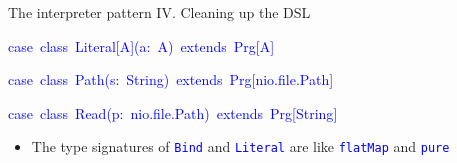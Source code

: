 \documentclass[english,,russian]{beamer}
\newenvironment{lyxcode}
  {\par\begin{list}{}{
    \setlength{\rightmargin}{\leftmargin}
    \setlength{\listparindent}{0pt}%
    \raggedright
    \setlength{\itemsep}{0pt}
    \setlength{\parsep}{0pt}
    \normalfont\ttfamily}%
   \def\{{\char`\{}
   \def\}{\char`\}}
   \def\textasciitilde{\char`\~}
   \item[]}
  {\end{list}}
\begin{document}
\begin{frame}{The interpreter pattern IV. Cleaning up the DSL}
\begin{lyxcode}
\textcolor{blue}{\footnotesize{}case~class~Literal{[}A{]}(a:~A)~extends~Prg{[}A{]}}{\footnotesize\par}

\textcolor{blue}{\footnotesize{}case~class~Path(s:~String)~extends~Prg{[}nio.file.Path{]}}{\footnotesize\par}

\textcolor{blue}{\footnotesize{}case~class~Read(p:~nio.file.Path)~extends~Prg{[}String{]}}{\footnotesize\par}
\end{lyxcode}
\begin{itemize}
\item \vspace{-0.0cm}The type signatures of \texttt{\textcolor{blue}{\footnotesize{}Bind}}
and \texttt{\textcolor{blue}{\footnotesize{}Literal}} are like \texttt{\textcolor{blue}{\footnotesize{}flatMap}}
and \texttt{\textcolor{blue}{\footnotesize{}pure}} 
\end{itemize}
\begin{lyxcode}
\end{lyxcode}
\end{frame}
\end{document}
